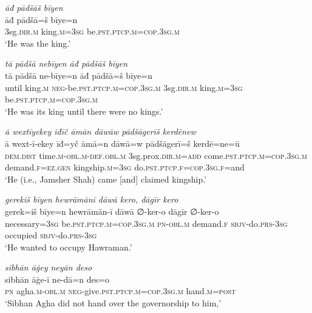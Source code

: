 \ea \label{DP.15}
\textit{āđ pādšāš bīyen} \\ 
\gll āđ pādšā=š bīye=n \\ 
 3sg\textsc{.dir}\textsc{.m} king\textsc{.m}\textsc{=3sg} be\textsc{.pst}\textsc{.ptcp}\textsc{.m}\textsc{=cop}\textsc{.3sg}\textsc{.m} \\ 
\glt `He was the king.'
\z 
 
\ea \label{DP.16}
\textit{tā pādšā nebīyen āđ pādšāš bīyen} \\ 
\gll tā pādšā ne-bīye=n āđ pādšā=š bīye=n \\ 
 until king\textsc{.m} \textsc{neg-}be\textsc{.pst}\textsc{.ptcp}\textsc{.m}\textsc{=cop}\textsc{.3sg}\textsc{.m} 3sg\textsc{.dir}\textsc{.m} king\textsc{.m}\textsc{=3sg} be\textsc{.pst}\textsc{.ptcp}\textsc{.m}\textsc{=cop}\textsc{.3sg}\textsc{.m} \\ 
\glt `He was its king until there were no kings.'
\z 
 
\ea \label{DP.17}
\textit{ā wextīyekey īđīč āmān dāwāw pādšāgerīš kerdēnew} \\ 
\gll ā wext-ī-ekey īđ=yč āmā=n dāwā=w pādšāgerī=š kerdē=ne=ū \\ 
 \textsc{dem.dist} time\textsc{.m}\textsc{-obl}\textsc{.m}\textsc{-def}\textsc{.obl}\textsc{.m} 3sg.prox\textsc{.dir}\textsc{.m}\textsc{=add} come\textsc{.pst}\textsc{.ptcp}\textsc{.m}\textsc{=cop}\textsc{.3sg}\textsc{.m} demand\textsc{\textsc{.f}}\textsc{=ez}\textsc{.gen} kingship\textsc{.m}\textsc{=3sg} do\textsc{.pst}\textsc{.ptcp}\textsc{\textsc{.f}}\textsc{=cop}\textsc{.3sg}\textsc{\textsc{.f}}=and \\ 
\glt `He (i.e., Jamsher Shah) came [and] claimed kingship.'
\z 
 
\ea \label{DP.18}
\textit{gerekiš bīyen hewrāmānī dāwā kero, dāgīr kero} \\ 
\gll gerek=iš bīye=n hewrāmān-ī dāwā ∅-ker-o dāgīr ∅-ker-o \\ 
 necessary\textsc{=3sg} be\textsc{.pst}\textsc{.ptcp}\textsc{.m}\textsc{=cop}\textsc{.3sg}\textsc{.m} \textsc{pn}\textsc{-obl}\textsc{.m} demand\textsc{\textsc{.f}} \textsc{sbjv-}do\textsc{.prs}\textsc{-3sg} occupied \textsc{sbjv-}do\textsc{.prs}\textsc{-3sg} \\ 
\glt `He wanted to occupy Hawraman.'
\z 
 
\ea \label{DP.19}
\textit{sibhān āġey neyān deso} \\ 
\gll sibhān āġe-ī ne-dā=n des=o \\ 
 \textsc{pn} agha\textsc{.m}\textsc{-obl}\textsc{.m} \textsc{neg-}give\textsc{.pst}\textsc{.ptcp}\textsc{.m}\textsc{=cop}\textsc{.3sg}\textsc{.m} hand\textsc{.m}\textsc{=\textsc{post}} \\ 
\glt `Sibhan Agha did not hand over the governorship to him,'
\z 
 
